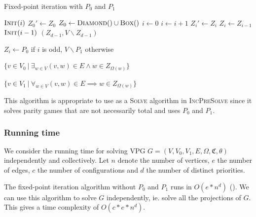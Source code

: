\begin{algorithm}
	\caption{Fixed-point iteration with $P_0$ and $P_1$}
	\label{alg_FPITE}
	\begin{multicols}{2}
		\begin{algorithmic}[1]
					\State $\textsc{Init}(i)$
				\EndFor
				\Repeat
					\State $Z_0'\gets Z_0$
					\State $Z_0 \gets \textsc{Diamond}() \cup \textsc{Box}()$
					\State $i \gets 0$
						\State $i \gets i+1$
						\State $Z_i' \gets Z_i$
						\State $Z_i \gets Z_{i-1}$
						\State $\textsc{Init}(i-1)$
					\EndWhile
				\State \Return $(Z_{d-1},V\backslash Z_{d-1})$
			\EndFunction
		\end{algorithmic}\bigskip\bigskip
		\begin{algorithmic}[1]
			\Function{Init}{$i$}
				\State $Z_i \gets P_0$ if $i$ is odd, $V\backslash P_1$ otherwise
			\EndFunction
		\end{algorithmic}\bigskip
		\begin{algorithmic}[1]
			\Function{Diamond}{}
				\State \Return $\{ v \in V_0\ |\ \exists_{w\in V} (v,w) \in E \wedge w \in Z_{\Omega(w)}\}$
			\EndFunction
		\end{algorithmic}\bigskip
		\begin{algorithmic}[1]
			\Function{Box}{}
			\State \Return $\{ v \in V_1\ |\ \forall_{w\in V} (v,w) \in E \implies w \in Z_{\Omega(w)}\}$
			\EndFunction
		\end{algorithmic}
	\end{multicols}
\end{algorithm}

This algorithm is appropriate to use as a \textsc{Solve} algorithm in \textsc{IncPreSolve} since it solves parity games that are not necessarily total and uses $P_0$ and $P_1$.

\subsubsection{Running time}
We consider the running time for solving VPG $G = (V,V_0,V_1,E,\Omega,\mathfrak{C},\theta)$ independently and collectively. Let $n$ denote the number of vertices, $e$ the number of edges, $c$ the number of configurations and $d$ the number of distinct priorities.

The fixed-point iteration algorithm without $P_0$ and $P_1$ runs in $O(e*n^d)$ (\cite{FPITE}). We can use this algorithm to solve $G$ independently, ie. solve all the projections of $G$. This gives a time complexity of $O(c*e*n^d)$.

